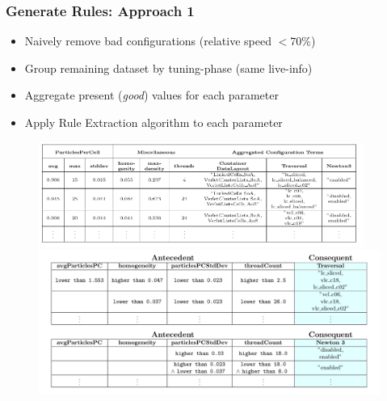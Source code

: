\documentclass[
	10pt,
	t		%
]{beamer}
\begin{document}
\begin{frame}
	\frametitle{Generate Rules: Approach 1}

	\begin{itemize}
		\item Naively remove bad configurations (relative speed $<70\%$)
		\item Group remaining dataset by tuning-phase (same live-info)
		\item Aggregate present (\textit{good}) values for each parameter
		\item Apply Rule Extraction algorithm to each parameter
	\end{itemize}

	\begin{figure}
		\centering
		\vspace{-0.1cm}
		\includegraphics[width=0.95\textwidth, trim={0 3.8cm 0 0},clip]{figures/aggregated-data-component.png}
		\includegraphics[width=1\textwidth, trim={0 8cm 0 0},clip]{figures/final-rules-component.png}
	\end{figure}
\end{frame}
\end{document}

